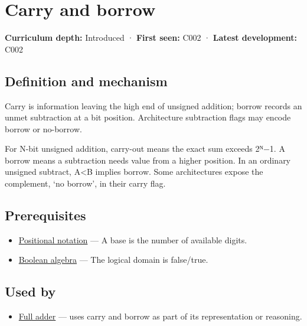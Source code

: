 \hypertarget{appendix-d52d5f78ffd1}{}\label{referencestart:appendix-d52d5f78ffd1}
\section{Carry and borrow}\label{appendix-d52d5f78ffd1-carry-and-borrow}

\textbf{Curriculum depth:} Introduced · \textbf{First seen:} C002 · \textbf{Latest development:} C002

\subsection{Definition and mechanism}\label{appendix-d52d5f78ffd1-definition-and-mechanism}

Carry is information leaving the high end of unsigned addition; borrow records an unmet subtraction at a bit position. Architecture subtraction flags may encode borrow or no-borrow.

For N-bit unsigned addition, carry-out means the exact sum exceeds 2ᴺ−1. A borrow means a subtraction needs value from a higher position. In an ordinary unsigned subtract, A\textless B implies borrow. Some architectures expose the complement, `no borrow', in their carry flag.

\subsection{Prerequisites}\label{appendix-d52d5f78ffd1-prerequisites}

\begin{itemize}
\tightlist
\item
  \hyperref[appendix-83c3f28f7bda]{Positional notation} --- A base is the number of available digits.
\item
  \hyperref[appendix-24475e1596a8]{Boolean algebra} --- The logical domain is false/true.
\end{itemize}

\subsection{Used by}\label{appendix-d52d5f78ffd1-used-by}

\begin{itemize}
\tightlist
\item
  \hyperref[appendix-d1a5b1e520c2]{Full adder} --- uses carry and borrow as part of its representation or reasoning.
\end{itemize}

